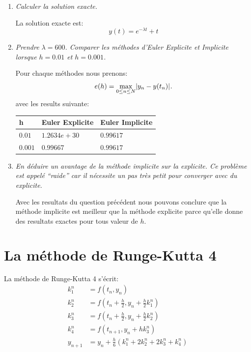 \documentclass[a4paper,10pt]{article}
\begin{document}
\begin{enumerate}
    \item \emph{Calculer la solution exacte.}

    La solution exacte est:
\[
    y(t) = e^{-\lambda t} + t
\]
    \item \emph{Prendre $\lambda = 600$. Comparer les méthodes d'Euler Explicite et
    Implicite lorsque $h = 0.01$ et $h = 0.001$.}

    Pour chaque méthodes nous prenons:
\[
    e(h) = \max_{0 \leq n \leq N} \lvert y_n - y(t_n)\rvert_{}.
\]
avec les results suivante:
\begin{center}
    \begin{tabular}{|l|l|l|}\hline
        h         & Euler Explicite         & Euler Implicite \\\hline
        $0.01$    & $1.2634e+30$            & $0.99617$ \\\hline
        $0.001$   & $0.99667$               & $0.99617$ \\\hline
    \end{tabular}
\end{center}

    \item \emph{En déduire un avantage de la méthode implicite sur la explicite. Ce
    problème est appelé ``raide'' car il nécessite un pas très petit pour
    converger avec du explicite.}

    Avec les resultats du question précédent nous pouvons conclure que la méthode
    implicite est meilleur que la méthode explicite parce qu'elle donne des resultats
    exactes pour tous valeur de $h$.

\end{enumerate}

\section{La méthode de Runge-Kutta 4}

La méthode de Runge-Kutta 4 s'écrit:
\begin{align}\nonumber
    k_1^n & = f(t_n, y_n) \\\nonumber
    k_2^n & = f(t_n + \frac{h}{2}, y_n + \frac{h}{2} k_1^n) \\
    k_3^n & = f(t_n + \frac{h}{2}, y_n + \frac{h}{2} k_2^n) \\\nonumber
    k_4^n & = f(t_{n + 1}, y_n + h k_3^n) \\\nonumber
    y_{n + 1} & = y_n + \frac{h}{6}(k_1^n + 2 k_2^n + 2k_3^n + k_4^n)
\end{align}
\end{document}
